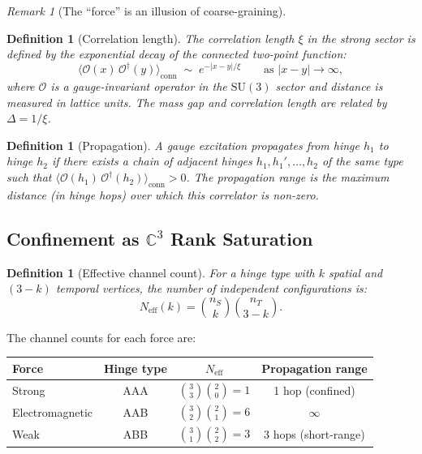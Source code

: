 \documentclass[12pt]{article}
\newtheorem{definition}[theorem]{Definition}
\theoremstyle{remark}
\newtheorem{remark}[theorem]{Remark}
\theoremstyle{definition}
\newcommand{\CC}{\mathbb{C}}
\begin{document}
\begin{remark}[The ``force'' is an illusion of coarse-graining]
\begin{definition}[Correlation length]
\label{def:correlation}
The \emph{correlation length} $\xi$ in the strong sector is defined by
the exponential decay of the connected two-point function:
\begin{equation}
\langle \mathcal{O}(x)\, \mathcal{O}^\dagger(y) \rangle_{\mathrm{conn}}
\;\sim\; e^{-|x - y|/\xi} \qquad \text{as } |x-y| \to \infty,
\end{equation}
where $\mathcal{O}$ is a gauge-invariant operator in the
$\mathrm{SU}(3)$ sector and distance is measured in lattice units.
The mass gap and correlation length are related by $\Delta = 1/\xi$.
\end{definition}

\begin{definition}[Propagation]
\label{def:propagation}
A gauge excitation \emph{propagates} from hinge $h_1$ to hinge $h_2$
if there exists a chain of adjacent hinges $h_1, h_1', \ldots, h_2$
of the same type such that $\langle \mathcal{O}(h_1)\,
\mathcal{O}^\dagger(h_2) \rangle_{\mathrm{conn}} > 0$.
The \emph{propagation range} is the maximum distance (in hinge hops)
over which this correlator is non-zero.
\end{definition}

\subsection{Confinement as $\CC^3$ Rank Saturation}
\label{sec:confinement}

\begin{definition}[Effective channel count]
For a hinge type with $k$ spatial and $(3-k)$ temporal vertices, the
number of independent configurations is:
\begin{equation}
N_{\mathrm{eff}}(k) = \binom{n_S}{k} \binom{n_T}{3-k}.
\end{equation}
\end{definition}

\noindent
The channel counts for each force are:

\begin{center}
\begin{tabular}{lccc}
\hline
Force & Hinge type & $N_{\mathrm{eff}}$ & Propagation range \\
\hline
Strong & AAA & $\binom{3}{3}\binom{2}{0} = 1$ & 1 hop (confined) \\
Electromagnetic & AAB & $\binom{3}{2}\binom{2}{1} = 6$ & $\infty$ \\
Weak & ABB & $\binom{3}{1}\binom{2}{2} = 3$ & 3 hops (short-range) \\
\hline
\end{tabular}
\end{center}


\end{remark}
\end{document}
